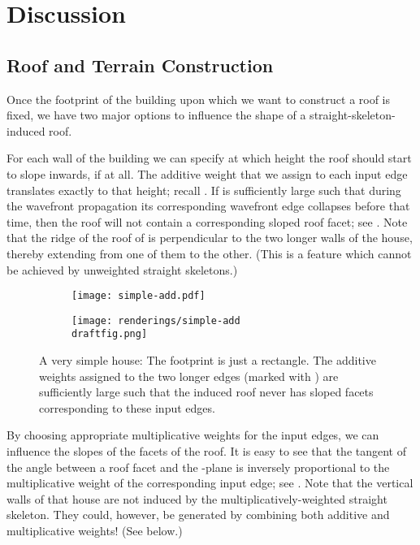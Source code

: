 \documentclass[preprint]{elsarticle}
\newcommand{\draftfig}{.small}
\begin{document}
\section{Discussion}

\subsection{Roof and Terrain Construction}

Once the footprint of the building upon which we want to construct a roof is
fixed, we have two major options to influence the shape of a
straight-skeleton-induced roof.

For each wall of the building we can specify at which height the roof
should start to slope inwards, if at all.  The additive weight  that
we assign to each input edge  translates exactly to that height; recall
.  If  is sufficiently large such that during
the wavefront propagation its corresponding wavefront edge collapses before
that time, then the roof will not contain a corresponding sloped roof facet;
see . Note that the ridge of the roof of
 is perpendicular to the two longer walls of the
house, thereby extending from one of them to the other. (This is a feature
which cannot be achieved by unweighted straight skeletons.)

\begin{figure}[htb!]
  \centering

  \begin{subfigure}[b]{0.48\textwidth}
    \centering
    \texttt{[image: simple-add.pdf]}
    \caption[]{}
  \end{subfigure}
  \hspace{0.1em}
  \begin{subfigure}[b]{0.48\textwidth}
    \centering
    \texttt{[image: renderings/simple-add\\draftfig.png]}
    \caption[]{}
  \end{subfigure}

  \caption{A very simple house: The footprint is just a rectangle.  The
    additive weights assigned to the two longer edges (marked with
    ) are sufficiently large such that the induced roof never has
    sloped facets corresponding to these input edges.  }
  \label{fig:simple-roof}
\end{figure}

By choosing appropriate multiplicative weights for the input edges, we
can influence the slopes of the facets of the roof. It is easy to see
that the tangent of the angle between a roof facet and the -plane
is inversely proportional to the multiplicative weight of the
corresponding input edge; see . Note that the
vertical walls of that house are not induced by the
multiplicatively-weighted straight skeleton. They could, however, be
generated by combining both additive and multiplicative weights! (See below.)
\end{document}
